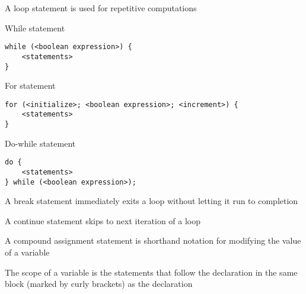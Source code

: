 \documentclass[8pt,a4paper,compress]{beamer}
\begin{document}
\begin{frame}[fragile]
\pause

A loop statement is used for repetitive computations

\pause
\bigskip

While statement
\begin{lstlisting}[language={}]
while (<boolean expression>) {
    <statements>
}
\end{lstlisting}

\pause
\bigskip

For statement
\begin{lstlisting}[language={}]
for (<initialize>; <boolean expression>; <increment>) {
    <statements>
}
\end{lstlisting}

\pause
\bigskip

Do-while statement
\begin{lstlisting}[language={}]
do {
    <statements>
} while (<boolean expression>);
\end{lstlisting}

\pause
\bigskip

A break statement immediately exits a loop without letting it run to completion

\pause
\bigskip

A continue statement skips to next iteration of a loop
\end{frame}

\begin{frame}[fragile]
\pause

A compound assignment statement is shorthand notation for modifying the value of a variable

\pause
\bigskip

The scope of a variable is the statements that follow the declaration in the same block (marked by curly brackets) as the declaration
\end{frame}
\end{document}
